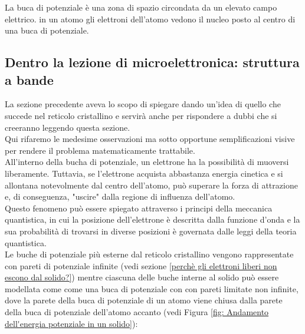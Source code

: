 La buca di potenziale è una zona di spazio circondata da un elevato campo elettrico. in un atomo gli elettroni dell'atomo vedono il nucleo posto al centro di una buca di potenziale.
%
\subsection{Dentro la lezione di microelettronica: struttura a bande}
La sezione precedente aveva lo scopo di spiegare dando un'idea di quello che succede nel reticolo cristallino e servirà anche per rispondere a dubbi che si creeranno leggendo questa sezione.\\
Qui rifaremo le medesime osservazioni ma sotto opportune semplificazioni visive per rendere il problema matematicamente trattabile.\\

All'interno della bucha di potenziale, un elettrone ha la possibilità di muoversi liberamente. Tuttavia, se l'elettrone acquista abbastanza energia cinetica e si allontana notevolmente dal centro dell'atomo, può superare la forza di attrazione e, di conseguenza, "uscire" dalla regione di influenza dell'atomo.\\
Questo fenomeno può essere spiegato attraverso i principi della meccanica quantistica, in cui la posizione dell'elettrone è descritta dalla funzione d'onda e la sua probabilità di trovarsi in diverse posizioni è governata dalle leggi della teoria quantistica.\\

Le buche di potenziale più esterne dal reticolo cristallino vengono rappresentate con pareti di potenziale infinite (vedi sezione \ref{perchè gli elettroni liberi non escono dal solido?}) mentre ciascuna delle buche interne al solido può essere modellata come come una buca di potenziale con con pareti limitate non infinite, dove la parete della buca di potenziale di un atomo viene chiusa dalla parete della buca di potenziale dell'atomo accanto (vedi Figura \ref{fig: Andamento dell'energia potenziale in un solido}):

